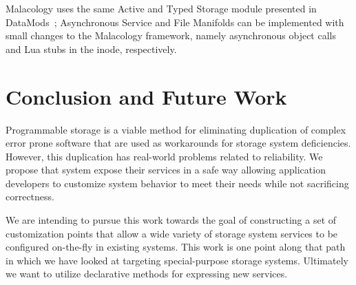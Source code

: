 \documentclass[preprint]{sigplanconf-eurosys}
\begin{document}
Malacology uses the same Active and Typed Storage module presented in
DataMods~\cite{watkins_datamods_2012}; Asynchronous Service and File
Manifolds can be implemented with small changes to the Malacology
framework, namely asynchronous object calls and Lua stubs in the inode,
respectively.

\section{Conclusion and Future Work}\label{conclusion-and-future-work}

Programmable storage is a viable method for eliminating duplication of complex
error prone software that are used as workarounds for storage system
deficiencies. However, this duplication has real-world problems related to
reliability. We propose that system expose their services in a safe way
allowing application developers to customize system behavior to meet their
needs while not sacrificing correctness.

We are intending to pursue this work towards the goal of constructing a set of
customization points that allow a wide variety of storage system services to be
configured on-the-fly in existing systems. This work is one point along that
path in which we have looked at targeting special-purpose storage systems.
Ultimately we want to utilize declarative methods for expressing new services.



\end{document}
